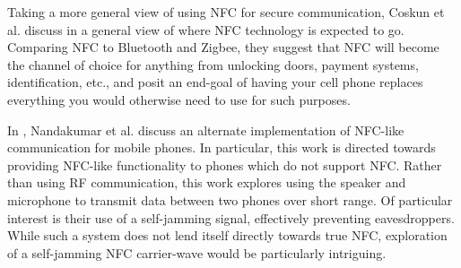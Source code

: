 Taking a more general view of using NFC for secure communication,
    Coskun et al. discuss in \cite{Coskun2013} a general view of where NFC technology is expected to go.
Comparing NFC to Bluetooth and Zigbee, they suggest that NFC will become the channel of choice for anything from unlocking doors, payment systems, identification, etc.,
    and posit an end-goal of having your cell phone replaces everything you would otherwise need to use for such purposes.

In \cite{nandakumar2013dhwani}, Nandakumar et al. discuss an alternate implementation of NFC-like communication for mobile phones.
In particular, this work is directed towards providing NFC-like functionality to phones which do not support NFC.
Rather than using RF communication, this work explores using the speaker and microphone to transmit data between two phones over short range.
Of particular interest is their use of a self-jamming signal, effectively preventing eavesdroppers.
While such a system does not lend itself directly towards true NFC, exploration of a self-jamming NFC carrier-wave would be particularly intriguing.
